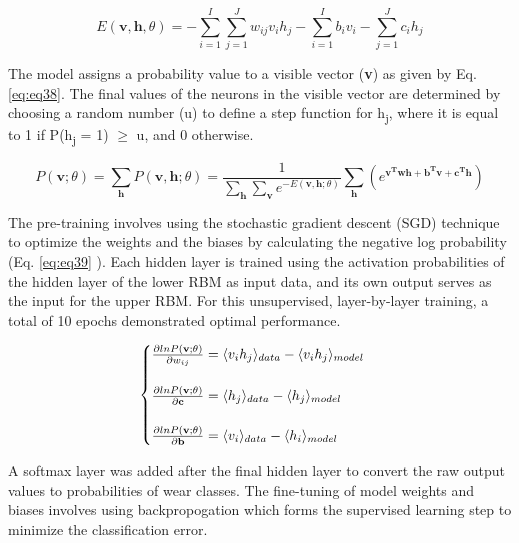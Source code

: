 \documentclass[preprint,review,12pt]{elsarticle}
\begin{document}
\begin{equation}\label{eq:eq37}
  E(\mathbf{v},\mathbf{h},\theta) = -\sum_{i=1}^{I}\sum_{j=1}^{J}w_{ij}v_ih_j-\sum_{i=1}^{I}b_iv_i-\sum_{j=1}^{J}c_ih_j
\end{equation}

The model assigns a probability value to a visible vector (\textbf{v}) as given by Eq. \ref{eq:eq38}. The final values of the neurons in the visible vector are determined by choosing a random number (u) to define a step function for h\textsubscript{j}, where it is equal to 1 if P(h\textsubscript{j} = 1) $\geq$ u, and 0 otherwise.

\begin{equation}\label{eq:eq38}
P(\mathbf{v}; \theta) = \sum_{\mathbf{h}}P(\mathbf{v},\mathbf{h};\theta)  = \frac{1}{\sum_{\mathbf{h}} \sum_{\mathbf{v}} e^{-E(\mathbf{v},\mathbf{h};\theta)}} \sum_{\mathbf{h}} (e^{\mathbf{v^Twh}+\mathbf{b^Tv}+\mathbf{c^Th}})
\end{equation}

The pre-training involves using the stochastic gradient descent (SGD) technique to optimize the weights and the biases by calculating the negative log probability (Eq. \ref{eq:eq39} \cite{CITE9}). Each hidden layer is trained using the activation probabilities of the hidden layer of the lower RBM as input data, and its own output serves as the input for the upper RBM. For this unsupervised, layer-by-layer training, a total of 10 epochs demonstrated optimal performance. \par

\begin{equation}\label{eq:eq39}
  \resizebox{0.5\textwidth}{!}
  {$
  \begin{cases}
    \frac{\partial{lnP(\mathbf{v};\theta)}}{\partial{w_{ij}}} = \langle{v_ih_j}\rangle_{data} - \langle{v_ih_j}\rangle_{model} \\\\
    \frac{\partial{lnP(\mathbf{v};\theta)}}{\partial{\mathbf{c}}} = \langle{h_j}\rangle_{data} - \langle{h_j}\rangle_{model} \\\\
    \frac{\partial{lnP(\mathbf{v};\theta)}}{\partial{\mathbf{b}}} = \langle{v_i}\rangle_{data} - \langle{h_i}\rangle_{model} \\
  \end{cases}
  $}
\end{equation}

A softmax layer was added after the final hidden layer to convert the raw output values to probabilities of wear classes. The fine-tuning of model weights and biases involves using backpropogation which forms the supervised learning step to minimize the classification error.
\end{document}
